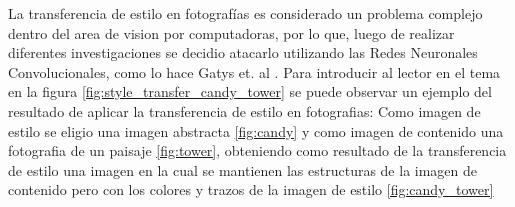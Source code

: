\documentclass[a4paper,11pt,spanish]{book}
\begin{document}
      La transferencia de estilo en fotografías es considerado un problema complejo dentro del area de vision por computadoras, por lo que, luego de realizar diferentes investigaciones se
      decidio atacarlo utilizando las Redes Neuronales Convolucionales, como lo hace Gatys et. al \cite{Gatys:Neural_Style}.
      Para introducir al lector en el tema en la figura \ref{fig:style_transfer_candy_tower} se puede observar un ejemplo del resultado de aplicar la transferencia de estilo en fotografias:
      Como imagen de estilo se eligio una imagen abstracta \ref{fig:candy} y como imagen de contenido una fotografia de un paisaje \ref{fig:tower}, obteniendo como resultado de la
      transferencia de estilo una imagen en la cual se mantienen las estructuras de la imagen de contenido pero con los colores y trazos de la imagen de estilo \ref{fig:candy_tower}
      \begin{figure}[h]

\end{figure}
\end{document}
